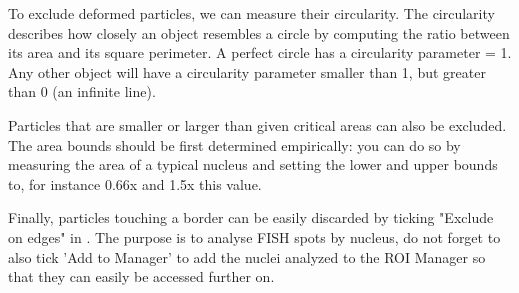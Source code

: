 \begin{enumerate}
    To exclude deformed particles, we can measure their circularity. The circularity describes how closely an object resembles a circle by computing the ratio between its area and its square perimeter. A perfect circle has a circularity parameter = 1. Any other object will have a circularity parameter smaller than 1, but greater than 0 (an infinite line). 
    
    Particles that are smaller or larger than given critical areas can also be excluded. The area bounds should be first determined empirically: you can do so by measuring the area of a typical nucleus and setting the lower and upper bounds to, for instance 0.66x and 1.5x this value. 
    
    Finally, particles touching a border can be easily discarded by ticking "Exclude on edges" in . The purpose is to analyse FISH spots by nucleus, do not forget to also tick 'Add to Manager' to add the nuclei analyzed to the ROI Manager so that they can easily be accessed further on.

\end{enumerate}    